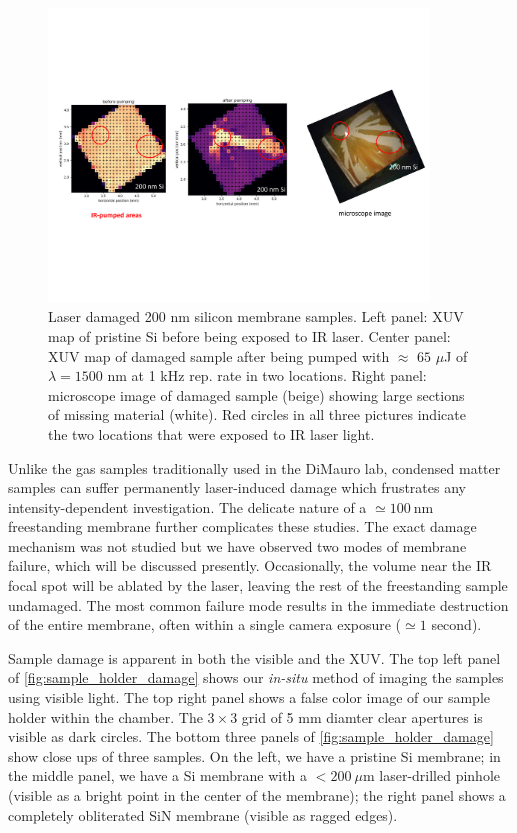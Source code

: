 \begin{figure}
	\centering
	\includegraphics[width=0.9\textwidth]{figures/chap4/Si_damage.pdf}
	\caption{Laser damaged 200 nm silicon membrane samples. Left panel: XUV map of pristine Si before being exposed to IR laser. Center panel: XUV map of damaged sample after being pumped with $\approx \text{ 65 }\mu$J of $\lambda = 1500 \text{ nm}$ at 1 kHz rep. rate in two locations. Right panel: microscope image of damaged sample (beige) showing large sections of missing material (white). Red circles in all three pictures indicate the two locations that were exposed to IR laser light.}
	\label{fig:Si_damage}
\end{figure}

Unlike the gas samples traditionally used in the DiMauro lab, condensed matter samples can suffer permanently laser-induced damage which frustrates any intensity-dependent investigation. The delicate nature of a $\simeq 100 \ \textrm{nm}$ freestanding membrane further complicates these studies. The exact damage mechanism was not studied but we have observed two modes of membrane failure, which will be discussed presently. Occasionally, the volume near the IR focal spot will be ablated by the laser, leaving the rest of the freestanding sample undamaged. The most common failure mode results in the immediate destruction of the entire membrane, often within a single camera exposure ($\simeq 1$ second).

Sample damage is apparent in both the visible and the XUV. The top left panel of \cref{fig:sample_holder_damage} shows our \textit{in-situ} method of imaging the samples using visible light. The top right panel shows a false color image of our sample holder within the chamber. The $3 \times 3$ grid of 5 mm diamter clear apertures is visible as dark circles. The bottom three panels of \cref{fig:sample_holder_damage} show close ups of three samples. On the left, we have a pristine Si membrane; in the middle panel, we have a Si membrane with a $< 200 \ \mu \textrm{m}$ laser-drilled pinhole (visible as a bright point in the center of the membrane); the right panel shows a completely obliterated SiN membrane (visible as ragged edges).

